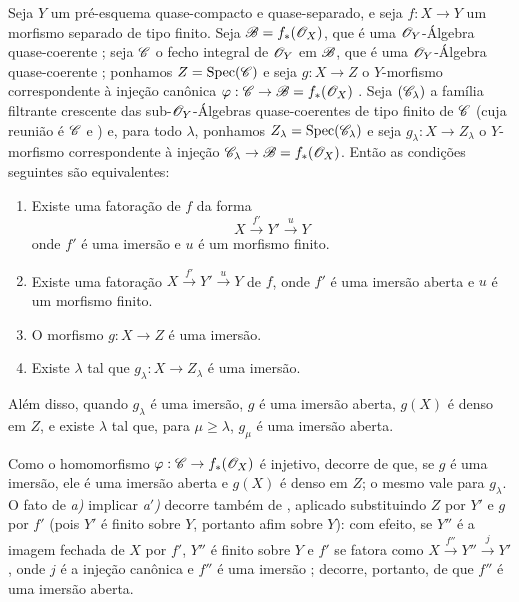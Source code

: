 \begin{proposition}[8.12.3]
\label{IV.8.12.3}
Seja $Y$ um pré-esquema quase-compacto e quase-separado, e seja $f:X\to Y$ um morfismo separado de tipo finito.
Seja $\mathscr{B}=f_*(\mathscr{O}_X)$, que é uma $\mathscr{O}_Y$-Álgebra quase-coerente ; seja $\mathscr{C}$ o fecho integral de $\mathscr{O}_Y$ em $\mathscr{B}$, que é uma $\mathscr{O}_Y$-Álgebra quase-coerente ; ponhamos $Z=\operatorname{Spec}(\mathscr{C})$ e seja $g:X\to Z$ o $Y$-morfismo correspondente à injeção canônica $\varphi:\sh{C}\to\sh{B}=f_*(\sh{O}_X)$ . Seja $(\mathscr{C}_\lambda)$ a família filtrante crescente das sub-$\mathscr{O}_Y$-Álgebras quase-coerentes de tipo finito de $\mathscr{C}$ (cuja reunião é $\mathscr{C}$  e ) e, para todo $\lambda$, ponhamos $Z_\lambda=\operatorname{Spec}(\mathscr{C}_\lambda)$ e seja $g_\lambda:X\to Z_\lambda$ o $Y$-morfismo correspondente à injeção $\sh{C}_\lambda\to\sh{B}=f_*(\sh{O}_X)$.
Então as condições seguintes são equivalentes:
\begin{enumerate}[label=\emph{\alph*)}]
  \item[\emph{a)}] Existe uma fatoração de $f$ da forma
\[
X\xrightarrow{f'}Y'\xrightarrow{u}Y
\]
onde $f'$ é uma imersão e $u$ é um morfismo finito.
  \item[\emph{a$'$)}] Existe uma fatoração $X\xrightarrow{f'}Y'\xrightarrow{u}Y$ de $f$, onde $f'$ é uma imersão aberta e $u$ é um morfismo finito.
  \item[\emph{b)}] O morfismo $g:X\to Z$ é uma imersão.
  \item[\emph{c)}] Existe $\lambda$ tal que $g_\lambda:X\to Z_\lambda$ é uma imersão.
\end{enumerate}
Além disso, quando $g_\lambda$ é uma imersão, $g$ é uma imersão aberta, $g(X)$ é denso em $Z$, e existe $\lambda$ tal que, para $\mu\geqslant\lambda$, $g_\mu$ é uma imersão aberta.
\end{proposition}

Como o homomorfismo $\varphi:\sh{C}\to f_*(\sh{O}_X)$ é injetivo, decorre de  que, se $g$ é uma imersão, ele é uma imersão aberta e $g(X)$ é denso em $Z$; o mesmo vale para $g_\lambda$.
O fato de \emph{a)} implicar \emph{a$'$)} decorre também de , aplicado substituindo $Z$ por $Y'$ e $g$ por $f'$ (pois $Y'$ é finito sobre $Y$, portanto afim sobre $Y$): com efeito, se $Y''$ é a imagem fechada de $X$ por $f'$, $Y''$ é finito sobre $Y$ e $f'$ se fatora como $X\xrightarrow{f''}Y''\xrightarrow{j}Y'$, onde $j$ é a injeção canônica e $f''$ é uma imersão ; decorre, portanto, de  que $f''$ é uma imersão aberta.

